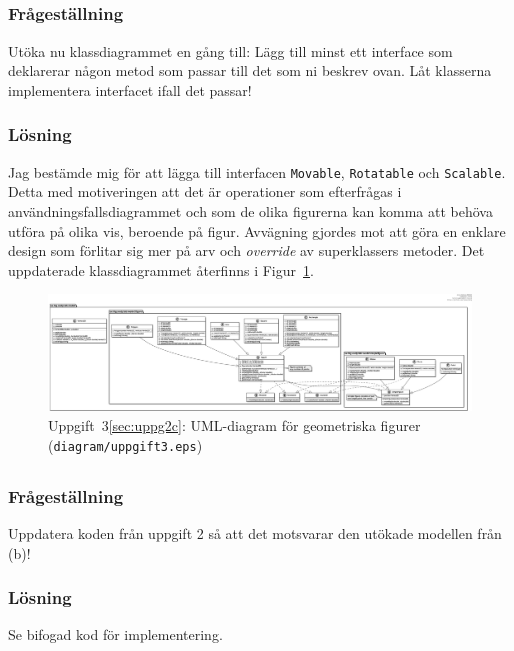 \subsection{}\label{sec:uppg3b}
\subsubsection*{Frågeställning}
Utöka nu klassdiagrammet en gång till: Lägg till minst ett interface som
deklarerar någon metod som passar till det som ni beskrev ovan. Låt klasserna
implementera interfacet ifall det passar!

\subsubsection*{Lösning}
Jag bestämde mig för att lägga till interfacen \texttt{Movable},
\texttt{Rotatable} och \texttt{Scalable}. Detta med motiveringen att det
är operationer som efterfrågas i användningsfallsdiagrammet och som de olika
figurerna kan komma att behöva utföra på olika vis, beroende på figur. 
Avvägning gjordes mot att göra en enklare design som förlitar sig mer på arv
och \emph{override} av superklassers metoder. Det uppdaterade klassdiagrammet
återfinns i Figur~\ref{fig:uppg3b}.

\begin{figure}
\centering
\includegraphics[width=\linewidth]{diagram/uppgift3.eps}
\caption{Uppgift~3\ref{sec:uppg2c}: UML-diagram för geometriska figurer
(\texttt{diagram/uppgift3.eps})}
\label{fig:uppg3b}
\end{figure}



\subsection{}\label{sec:uppg3c}
\subsubsection*{Frågeställning}
Uppdatera koden från uppgift 2 så att det motsvarar den utökade modellen från
(b)!

\subsubsection*{Lösning}
Se bifogad kod för implementering.


